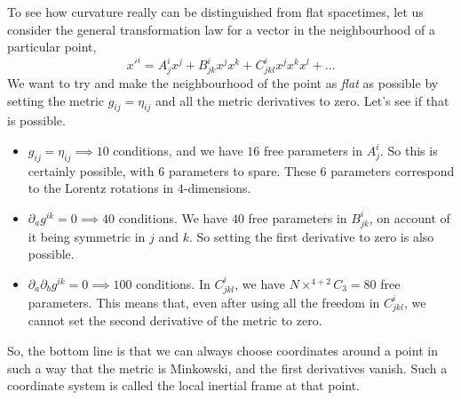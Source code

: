 \documentclass[a4paper,11pt]{article}
\begin{document}
To see how curvature really can be distinguished from flat spacetimes, let us consider the general transformation law for a vector in the neighbourhood of a particular point,
\begin{equation}\label{key}
x'^i = A^i_j x^j + B^i_{jk} x^j x^k + C^i_{jkl} x^j x^k x^l + \ldots
\end{equation}
We want to try and make the neighbourhood of the point as \textit{flat} as possible by setting the metric $ g_{ij}= \eta_{ij} $ and all the metric derivatives to zero. Let's see if that is possible.
\begin{itemize}
	\item $ g_{ij} = \eta_{ij} \implies 10$ conditions, and we have $ 16 $ free parameters in $ A^i_j $. So this is certainly possible, with $ 6 $ parameters to spare. These $ 6 $ parameters correspond to the Lorentz rotations in $ 4 $-dimensions.
	\item $ \partial_a g^{ik} = 0 \implies 40 $ conditions. We have $ 40 $ free parameters in $ B^i_{jk} $, on account of it being symmetric in $ j $ and $ k $. So setting the first derivative to zero is also possible.
	\item $ \partial_a \partial_b g^{ik} = 0 \implies 100 $ conditions. In $ C^i_{jkl} $, we have $ N \times ^{4+2}C_3 = 80 $ free parameters. This means that, even after using all the freedom in $ C^i_{jkl} $, we cannot set the second derivative of the metric to zero.
\end{itemize}
So, the bottom line is that we can always choose coordinates around a point in such a way that the metric is Minkowski, and the first derivatives vanish. Such a coordinate system is called the local inertial frame at that point.
\end{document}
